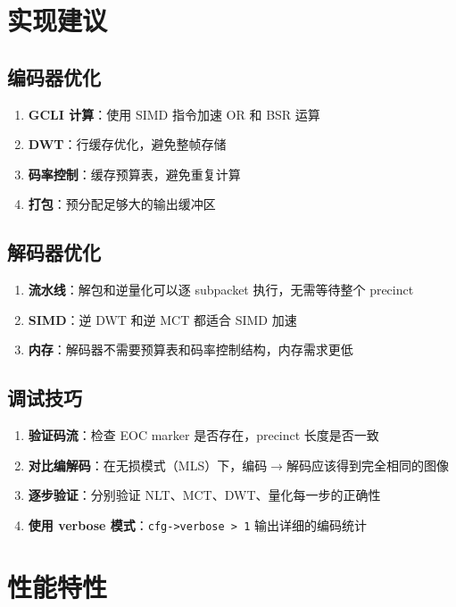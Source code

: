 \section{实现建议}

\subsection{编码器优化}

\begin{enumerate}
  \item \textbf{GCLI 计算}：使用 SIMD 指令加速 OR 和 BSR 运算
  \item \textbf{DWT}：行缓存优化，避免整帧存储
  \item \textbf{码率控制}：缓存预算表，避免重复计算
  \item \textbf{打包}：预分配足够大的输出缓冲区
\end{enumerate}

\subsection{解码器优化}

\begin{enumerate}
  \item \textbf{流水线}：解包和逆量化可以逐 subpacket 执行，无需等待整个 precinct
  \item \textbf{SIMD}：逆 DWT 和逆 MCT 都适合 SIMD 加速
  \item \textbf{内存}：解码器不需要预算表和码率控制结构，内存需求更低
\end{enumerate}

\subsection{调试技巧}

\begin{enumerate}
  \item \textbf{验证码流}：检查 EOC marker 是否存在，precinct 长度是否一致
  \item \textbf{对比编解码}：在无损模式（MLS）下，编码$\to$解码应该得到完全相同的图像
  \item \textbf{逐步验证}：分别验证 NLT、MCT、DWT、量化每一步的正确性
  \item \textbf{使用 verbose 模式}：\texttt{cfg->verbose > 1} 输出详细的编码统计
\end{enumerate}

\section{性能特性}

